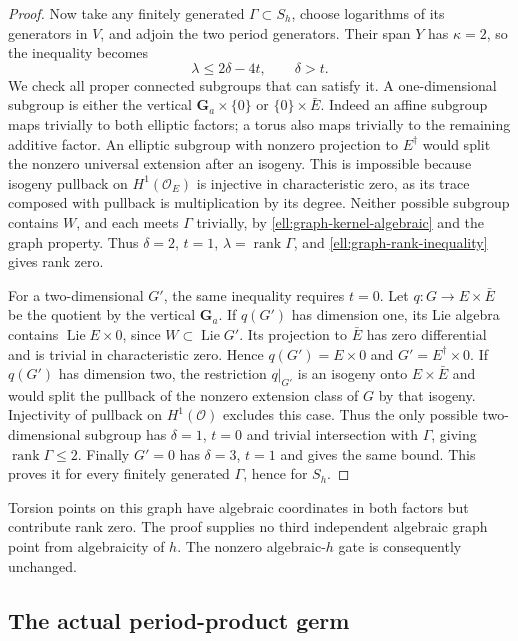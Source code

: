 \begin{proof}
Now take any finitely generated $\Gamma\subset S_h$, choose
logarithms of its generators in $V$, and adjoin the two period
generators. Their span $Y$ has $\kappa=2$, so the inequality becomes
\begin{equation}\label{ell:graph-rank-inequality}
 \lambda\le2\delta-4t,\qquad\delta>t.
\end{equation}
We check all proper connected subgroups that can satisfy it.
A one-dimensional subgroup is either the vertical
$\mathbf G_a\times\{0\}$ or $\{0\}\times\bar E$.
Indeed an affine subgroup maps trivially to both elliptic factors;
a torus also maps trivially to the remaining additive factor.
An elliptic subgroup with nonzero projection to $E^\dagger$ would
split the nonzero universal extension after an isogeny. This is
impossible because isogeny pullback on $H^1(\mathcal O_E)$ is
injective in characteristic zero, as its trace composed with
pullback is multiplication by its degree.
Neither possible subgroup contains $W$, and each meets $\Gamma$
trivially, by \eqref{ell:graph-kernel-algebraic} and the graph
property. Thus $\delta=2$, $t=1$, $\lambda=\operatorname{rank}\Gamma$,
and \eqref{ell:graph-rank-inequality} gives rank zero.

For a two-dimensional $G'$, the same inequality requires $t=0$.
Let $q:G\to E\times\bar E$ be the quotient by the vertical
$\mathbf G_a$. If $q(G')$ has dimension one, its Lie algebra contains
$\operatorname{Lie}E\times0$, since $W\subset\operatorname{Lie}G'$.
Its projection to $\bar E$ has zero differential and is trivial in
characteristic zero. Hence $q(G')=E\times0$ and
$G'=E^\dagger\times0$. If $q(G')$ has dimension two, the restriction
$q|_{G'}$ is an isogeny onto $E\times\bar E$ and would split the
pullback of the nonzero extension class of $G$ by that isogeny.
Injectivity of pullback on $H^1(\mathcal O)$ excludes this case.
Thus the only possible two-dimensional subgroup has
$\delta=1$, $t=0$ and trivial intersection with $\Gamma$, giving
$\operatorname{rank}\Gamma\le2$.
Finally $G'=0$ has $\delta=3$, $t=1$ and gives the same bound.
This proves it for every finitely generated $\Gamma$, hence for $S_h$.
\end{proof}

Torsion points on this graph have algebraic coordinates in both
factors but contribute rank zero. The proof supplies no third
independent algebraic graph point from algebraicity of $h$.
The nonzero algebraic-$h$ gate is consequently unchanged.


\subsection{The actual period-product germ}

